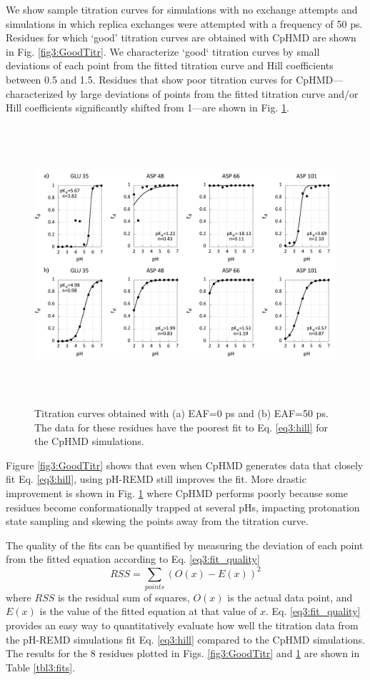 We show sample titration curves for simulations with no exchange attempts and
simulations in which replica exchanges were attempted with a frequency of 50
ps.  Residues for which `good' titration curves are obtained with
CpHMD are shown in Fig. \ref{fig3:GoodTitr}.  We characterize `good` titration
curves by small deviations of each point from the fitted titration curve and
Hill coefficients between 0.5 and 1.5. Residues that show poor titration curves
for CpHMD---characterized by large deviations of points from the fitted
titration curve and/or Hill coefficients significantly shifted from 1---are
shown in Fig. \ref{fig3:BadTitr}.

\begin{figure}
 \includegraphics[width=6.5in, height=4.06in]{Comparison_bad_curves.png}
 \caption{Titration curves obtained with (a) EAF=0 ps and (b) EAF=50
          ps. The data for these residues have the poorest fit to Eq.
          \ref{eq3:hill} for the CpHMD simulations.}
 \label{fig3:BadTitr}
\end{figure}

Figure \ref{fig3:GoodTitr} shows that even when CpHMD generates data that
closely fit Eq.  \ref{eq3:hill}, using pH-REMD still improves the fit. More
drastic improvement is shown in Fig. \ref{fig3:BadTitr} where CpHMD performs
poorly because some residues become conformationally trapped at several pHs,
impacting protonation state sampling and skewing the points away from the
titration curve.

The quality of the fits can be quantified by measuring the deviation of each
point from the fitted equation according to Eq. \ref{eq3:fit_quality}
\begin{equation}
 RSS = \sum_{points} \left( O(x) - E(x) \right) ^ 2
 \label{eq3:fit_quality}
\end{equation}
where $RSS$ is the residual sum of squares, $O(x)$ is the actual data point, and
$E(x)$ is the value of the fitted equation at that value of $x$. Eq.
\ref{eq3:fit_quality} provides an easy way to quantitatively evaluate how well
the titration data from the pH-REMD simulations fit Eq. \ref{eq3:hill} compared
to the CpHMD simulations.  The results for the 8 residues plotted in Figs.
\ref{fig3:GoodTitr} and \ref{fig3:BadTitr} are shown in Table \ref{tbl3:fits}.

